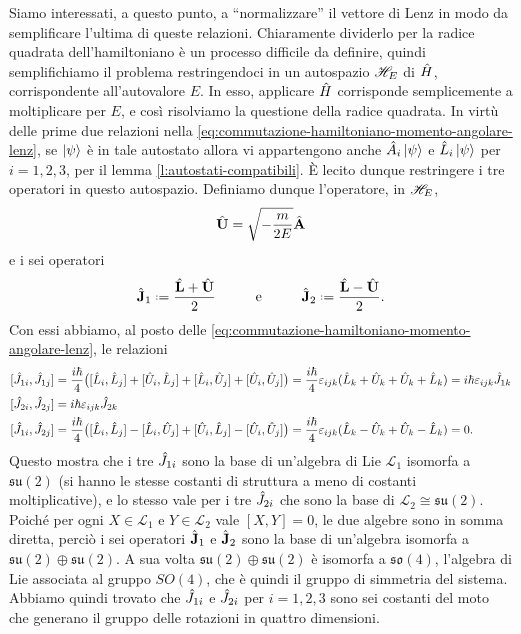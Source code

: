 Siamo interessati, a questo punto, a ``normalizzare'' il vettore di Lenz in modo da semplificare l'ultima di queste relazioni.
Chiaramente dividerlo per la radice quadrata dell'hamiltoniano è un processo difficile da definire, quindi semplifichiamo il problema restringendoci in un autospazio $\mathscr H_E$ di $\hat{H}$, corrispondente all'autovalore $E$.
In esso, applicare $\hat{H}$ corrisponde semplicemente a moltiplicare per $E$, e cos\`i risolviamo la questione della radice quadrata.
In virtù delle prime due relazioni nella \eqref{eq:commutazione-hamiltoniano-momento-angolare-lenz}, se $\left|{\psi}\right\rangle$ è in tale autostato allora vi appartengono anche $\hat{A}_i\left|{\psi}\right\rangle$ e $\hat{L}_i\left|{\psi}\right\rangle$ per $i=1,2,3$, per il lemma \ref{l:autostati-compatibili}.
È lecito dunque restringere i tre operatori in questo autospazio.
Definiamo dunque l'operatore, in $\mathscr H_E$,
\begin{equation}
	\hat{\mathbf{U}}=\sqrt{-\frac{m}{2E}}\hat{\mathbf{A}}
\end{equation}
e i sei operatori
\begin{equation}
	\op{\vec J}_1\defeq\frac{\op{\vec L}+\op{\vec U}}2\hspace{1cm}\text{e}\hspace{1cm}\op{\vec J}_2\defeq\frac{\op{\vec L}-\op{\vec U}}2.
	\label{eq:momento-angolare-SO4}
\end{equation}
Con essi abbiamo, al posto delle \eqref{eq:commutazione-hamiltoniano-momento-angolare-lenz}, le relazioni
\begin{equation}
	\begin{aligned}
		[\op J_{1i},\op J_{1j}]&=
			\frac{i\hbar}4\big([\op L_i,\op L_j]+[\op U_i,\op L_j]+[\op L_i,\op U_j]+[\op U_i,\op U_j]\big)=
			\frac{i\hbar}4\epsilon_{ijk}(\op L_k+\op U_k+\op U_k+\op L_k)=
			i\hbar\epsilon_{ijk}\op J_{1k}\\
		[\op J_{2i},\op J_{2j}]&=
			i\hbar\epsilon_{ijk}\op J_{2k}\\
		[\op J_{1i},\op J_{2j}]&=
			\frac{i\hbar}4\big([\op L_i,\op L_j]-[\op L_i,\op U_j]+[\op U_i,\op L_j]-[\op U_i,\op U_j]\big)=
			\frac{i\hbar}4\epsilon_{ijk}(\op L_k-\op U_k+\op U_k-\op L_k)=
			0.
	\end{aligned}
\end{equation}
Questo mostra che i tre $\hat{J}_{1i}$ sono la base di un'algebra di Lie $\mathscr L_1$ isomorfa a $\mathfrak{su}(2)$ (si hanno le stesse costanti di struttura a meno di costanti moltiplicative), e lo stesso vale per i tre $\hat{J}_{2i}$ che sono la base di $\mathscr L_2\cong\mathfrak{su}(2)$.
Poich\'e per ogni $X\in\mathscr L_1$ e $Y\in\mathscr L_2$ vale $[X,Y]=0$, le due algebre sono in somma diretta, perciò i sei operatori $\hat{\mathbf{J}}_1$ e $\hat{\mathbf{J}}_2$ sono la base di un'algebra isomorfa a $\mathfrak{su}(2)\oplus\mathfrak{su}(2)$.
A sua volta $\mathfrak{su}(2)\oplus\mathfrak{su}(2)$ è isomorfa a $\mathfrak{so}(4)$, l'algebra di Lie associata al gruppo $SO(4)$, che è quindi il gruppo di simmetria del sistema.
Abbiamo quindi trovato che $\hat{J}_{1i}$ e $\hat{J}_{2i}$ per $i=1,2,3$ sono sei costanti del moto che generano il gruppo delle rotazioni in quattro dimensioni.

